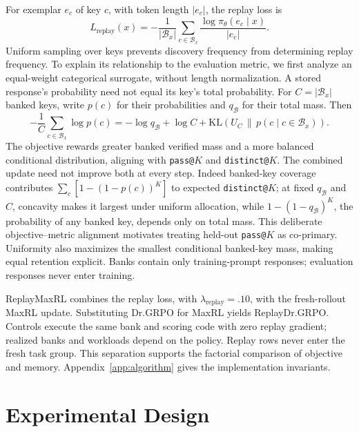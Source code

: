 \documentclass{article}
\newcommand{\1}{\mathbf 1}
\theoremstyle{remark}
\theoremstyle{definition}
\theoremstyle{plain}
\begin{document}
For exemplar $e_c$ of key $c$, with token length $|e_c|$, the replay loss is
\begin{equation}
  L_\mathrm{replay}(x)
  =-\frac{1}{|\mathcal B_x|}
    \sum_{c\in\mathcal B_x}
    \frac{\log\pi_\theta(e_c\mid x)}{|e_c|}.
  \label{eq:lm-verified-replay}
\end{equation}
Uniform sampling over keys prevents discovery frequency from determining replay
frequency. To explain its relationship to the evaluation metric, we first
analyze an equal-weight categorical surrogate, without length normalization.
A stored response's probability need not equal its key's total probability.
For $C=|\mathcal B_x|$ banked keys, write $p(c)$ for their probabilities
and $q_{\mathcal B}$ for their total mass. Then
\begin{equation}
 -\frac1C\sum_{c\in\mathcal B_x}\log p(c)
 =-\log q_{\mathcal B}+\log C+
   \mathrm{KL}\!\left(U_C\,\|\,
   p(c\mid c\in\mathcal B_x)\right).
 \label{eq:replay-bank-decomposition}
\end{equation}
The objective rewards greater banked verified mass and a more balanced
conditional distribution, aligning with \texttt{pass@}$K$ and
\texttt{distinct@}$K$. The combined update need not improve both at every step. Indeed banked-key coverage contributes
$\sum_c[1-(1-p(c))^K]$ to expected \texttt{distinct@}$K$; at fixed
$q_{\mathcal B}$ and $C$, concavity makes it largest under uniform allocation,
while $1-(1-q_{\mathcal B})^K$, the probability of any banked key, depends
only on total mass. This deliberate objective--metric alignment motivates
treating held-out \texttt{pass@}$K$ as co-primary. Uniformity also maximizes the
smallest conditional banked-key mass, making equal retention explicit. Banks
contain only training-prompt responses; evaluation responses never enter
training.

ReplayMaxRL combines the replay loss, with
$\lambda_{\mathrm{replay}}=.10$, with the fresh-rollout MaxRL update.
Substituting Dr.GRPO for MaxRL yields ReplayDr.GRPO. Controls execute the
same bank and scoring code with zero replay gradient; realized banks and
workloads depend on the policy. Replay rows never enter the fresh task group. This separation supports the
factorial comparison of objective and memory. Appendix~\ref{app:algorithm}
gives the implementation invariants.

\section{Experimental Design}
\label{sec:experiments}
\end{document}
